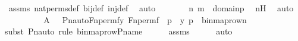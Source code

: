 \begin{isabellebody}
\ assms\ nat{\isacharunderscore}{\kern0pt}perms{\isacharunderscore}{\kern0pt}def\ bij{\isacharunderscore}{\kern0pt}def\ inj{\isacharunderscore}{\kern0pt}def\ \isamarkupfalse%
\ auto\isanewline
\ \ \ \ \isamarkupfalse%
\ \isamarkupfalse%
\ {\isachardoublequoteopen}{\isacharless}{\kern0pt}n{\isacharcomma}{\kern0pt}\ m{\isachargreater}{\kern0pt}\ {\isasymin}\ domain{\isacharparenleft}{\kern0pt}p{\isacharparenright}{\kern0pt}{\isachardoublequoteclose}\ \isamarkupfalse%
\ n{\isacharprime}{\kern0pt}H\ \isamarkupfalse%
\ auto\isanewline
\ \ \isamarkupfalse%
\isanewline
\ \ \ \ \ \isanewline
\ \ \isamarkupfalse%
\ {\isachardoublequoteopen}{\isacharquery}{\kern0pt}A\ {\isacharequal}{\kern0pt}\ {\isacharbraceleft}{\kern0pt}\ {\isacharless}{\kern0pt}Pn{\isacharunderscore}{\kern0pt}auto{\isacharparenleft}{\kern0pt}Fn{\isacharunderscore}{\kern0pt}perm{\isacharprime}{\kern0pt}{\isacharparenleft}{\kern0pt}f{\isacharparenright}{\kern0pt}{\isacharparenright}{\kern0pt}{\isacharbackquote}{\kern0pt}y{\isacharcomma}{\kern0pt}\ Fn{\isacharunderscore}{\kern0pt}perm{\isacharprime}{\kern0pt}{\isacharparenleft}{\kern0pt}f{\isacharparenright}{\kern0pt}\ {\isacharbackquote}{\kern0pt}\ p{\isachargreater}{\kern0pt}\ {\isachardot}{\kern0pt}\ {\isacharless}{\kern0pt}y{\isacharcomma}{\kern0pt}\ p{\isachargreater}{\kern0pt}\ {\isasymin}\ binmap{\isacharunderscore}{\kern0pt}row{\isacharprime}{\kern0pt}{\isacharparenleft}{\kern0pt}n{\isacharparenright}{\kern0pt}\ {\isacharbraceright}{\kern0pt}{\isachardoublequoteclose}\ \isanewline
\ \ \ \ \isamarkupfalse%
{\isacharparenleft}{\kern0pt}subst\ Pn{\isacharunderscore}{\kern0pt}auto{\isacharcomma}{\kern0pt}\ rule\ binmap{\isacharunderscore}{\kern0pt}row{\isacharprime}{\kern0pt}{\isacharunderscore}{\kern0pt}P{\isacharunderscore}{\kern0pt}name{\isacharparenright}{\kern0pt}\isanewline
\ \ \ \ \isamarkupfalse%
\ assms\isanewline
\ \ \ \ \isamarkupfalse%
\ auto\isanewline
\ \ \isamarkupfalse%
\ \isamarkupfalse%

\end{isabellebody}
